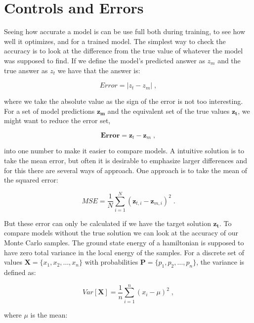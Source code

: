 \section{Controls and Errors}\label{subsec:variance_monte}

Seeing how accurate a model is can be use full both during training, to see how well it optimizes, and for a trained model. The simplest way to check the accuracy is to look at the difference from the true value of whatever the model was supposed to find. If we define the model's predicted answer as $z_{m}$ and the true answer as $z_{t}$ we have that the answer is:

\begin{equation}
  Error = |z_t-z_m| \; ,
  \label{eq:theory_error}
\end{equation}

where we take the absolute value as the sign of the error is not too interesting. For a set of model predictions $\boldsymbol{z_m}$ and the equivalent set of the true values $\boldsymbol{z_t}$, we might want to reduce the error set,

$$\textbf{Error} = \boldsymbol{z}_t-\boldsymbol{z}_m \; ,$$

into one number to make it easier to compare models. A intuitive solution is to take the mean error, but often it is desirable to emphasize larger differences and for this there are several ways of approach. One approach is to take the mean of the squared error:

\begin{equation} \label{eq:mse}
    MSE = \frac{1}{N} \sum_{i = 1}^N (\boldsymbol{z}_{t, i} - \boldsymbol{z}_{m, i})^2 \; .
\end{equation}

But these error can only be calculated if we have the target solution $\boldsymbol{z_t}$. To compare models without the true solution we can look at the accuracy of our Monte Carlo samples. The ground state energy of a hamiltonian is supposed to have zero total variance in the local energy of the samples. For a discrete set of values $\boldsymbol{X} = \{x_1, x_2, \dots, x_n\}$ with probabilities $\boldsymbol{P} = \{p_1, p_2, \dots, p_n\}$, the variance is defined as:

\begin{equation}
  Var[\boldsymbol{X}] = \frac{1}{n} \sum_{i=1}^{n} \left (x_i - \mu \right)^2 \; ,
  \label{eq:variance_theory}
\end{equation}

where $\mu$ is the mean:

